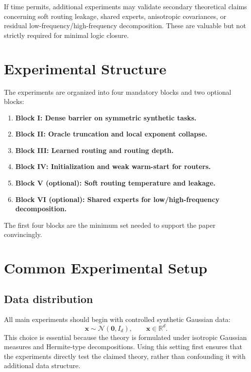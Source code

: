\documentclass[11pt]{article}
\begin{document}
If time permits, additional experiments may validate secondary theoretical claims concerning soft routing leakage, shared experts, anisotropic covariances, or residual low-frequency/high-frequency decomposition. These are valuable but not strictly required for minimal logic closure.

\section{Experimental Structure}

The experiments are organized into four mandatory blocks and two optional blocks:

\begin{enumerate}[leftmargin=2em]
    \item \textbf{Block I: Dense barrier on symmetric synthetic tasks.}
    \item \textbf{Block II: Oracle truncation and local exponent collapse.}
    \item \textbf{Block III: Learned routing and routing depth.}
    \item \textbf{Block IV: Initialization and weak warm-start for routers.}
    \item \textbf{Block V (optional): Soft routing temperature and leakage.}
    \item \textbf{Block VI (optional): Shared experts for low/high-frequency decomposition.}
\end{enumerate}

The first four blocks are the minimum set needed to support the paper convincingly.

\section{Common Experimental Setup}

\subsection{Data distribution}

All main experiments should begin with controlled synthetic Gaussian data:
\begin{equation}
    \bm{x} \sim \mathcal{N}(\bm{0}, I_d), \qquad \bm{x} \in \mathbb{R}^d.
\end{equation}
This choice is essential because the theory is formulated under isotropic Gaussian measures and Hermite-type decompositions. Using this setting first ensures that the experiments directly test the claimed theory, rather than confounding it with additional data structure.
\end{document}
